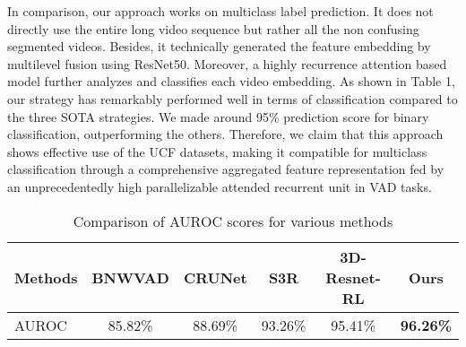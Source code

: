 \documentclass[runningheads]{llncs}
\begin{document}
In comparison, our approach works on multiclass label prediction. It does not directly use the entire long video sequence but rather all the non confusing segmented videos. Besides, it technically generated the feature embedding by multilevel fusion using ResNet50. Moreover, a highly recurrence attention based model further analyzes and classifies each video embedding.  As shown in Table 1, our strategy has remarkably performed well in terms of classification compared to the three SOTA strategies. We made around 95\% prediction score for binary classification, outperforming the others. Therefore, we claim that this approach shows effective use of the UCF datasets, making it compatible for multiclass classification through a comprehensive aggregated feature representation fed by an unprecedentedly high parallelizable attended recurrent unit in VAD tasks. 


\begin{table}[h]
\centering
\begin{tabular}{l *{5}{c}}
\toprule
Methods \hspace{5mm} & BNWVAD \hspace{2mm} & CRUNet \hspace{2mm}& S3R \hspace{2mm}& 3D-Resnet-RL \hspace{2mm}& \textbf{Ours} \\ 
\midrule
AUROC & 85.82\% & 88.69\% & 93.26\% & 95.41\% & \textbf{96.26\%} \\
\bottomrule
\end{tabular}
\vspace{5mm}
\caption{Comparison of AUROC scores for various methods}
\end{table}
\end{document}
